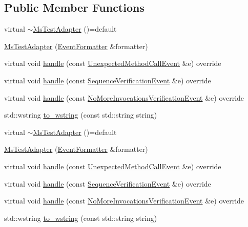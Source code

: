 \subsection*{Public Member Functions}
\begin{DoxyCompactItemize}
\item 
virtual \mbox{\hyperlink{classfakeit_1_1MsTestAdapter_a0385f70071a8698332bd6858e9f70641}{$\sim$\+Ms\+Test\+Adapter}} ()=default
\item 
\mbox{\hyperlink{classfakeit_1_1MsTestAdapter_ae54dad496e1b90c559d54f7570a59fc6}{Ms\+Test\+Adapter}} (\mbox{\hyperlink{structfakeit_1_1EventFormatter}{Event\+Formatter}} \&formatter)
\item 
virtual void \mbox{\hyperlink{classfakeit_1_1MsTestAdapter_acee4f347e97ef8b0fa1ed66fe8b2841a}{handle}} (const \mbox{\hyperlink{structfakeit_1_1UnexpectedMethodCallEvent}{Unexpected\+Method\+Call\+Event}} \&e) override
\item 
virtual void \mbox{\hyperlink{classfakeit_1_1MsTestAdapter_a4dc4f419d6240e57cfea660202f67ec1}{handle}} (const \mbox{\hyperlink{structfakeit_1_1SequenceVerificationEvent}{Sequence\+Verification\+Event}} \&e) override
\item 
virtual void \mbox{\hyperlink{classfakeit_1_1MsTestAdapter_aff7f5f707e15b1dcd2d05743a026bbbd}{handle}} (const \mbox{\hyperlink{structfakeit_1_1NoMoreInvocationsVerificationEvent}{No\+More\+Invocations\+Verification\+Event}} \&e) override
\item 
std\+::wstring \mbox{\hyperlink{classfakeit_1_1MsTestAdapter_ae713825b49decc24c6cdeffc14f6c783}{to\+\_\+wstring}} (const std\+::string string)
\item 
virtual \mbox{\hyperlink{classfakeit_1_1MsTestAdapter_a0385f70071a8698332bd6858e9f70641}{$\sim$\+Ms\+Test\+Adapter}} ()=default
\item 
\mbox{\hyperlink{classfakeit_1_1MsTestAdapter_ae54dad496e1b90c559d54f7570a59fc6}{Ms\+Test\+Adapter}} (\mbox{\hyperlink{structfakeit_1_1EventFormatter}{Event\+Formatter}} \&formatter)
\item 
virtual void \mbox{\hyperlink{classfakeit_1_1MsTestAdapter_acee4f347e97ef8b0fa1ed66fe8b2841a}{handle}} (const \mbox{\hyperlink{structfakeit_1_1UnexpectedMethodCallEvent}{Unexpected\+Method\+Call\+Event}} \&e) override
\item 
virtual void \mbox{\hyperlink{classfakeit_1_1MsTestAdapter_a4dc4f419d6240e57cfea660202f67ec1}{handle}} (const \mbox{\hyperlink{structfakeit_1_1SequenceVerificationEvent}{Sequence\+Verification\+Event}} \&e) override
\item 
virtual void \mbox{\hyperlink{classfakeit_1_1MsTestAdapter_aff7f5f707e15b1dcd2d05743a026bbbd}{handle}} (const \mbox{\hyperlink{structfakeit_1_1NoMoreInvocationsVerificationEvent}{No\+More\+Invocations\+Verification\+Event}} \&e) override
\item 
std\+::wstring \mbox{\hyperlink{classfakeit_1_1MsTestAdapter_ae713825b49decc24c6cdeffc14f6c783}{to\+\_\+wstring}} (const std\+::string string)
\end{DoxyCompactItemize}


